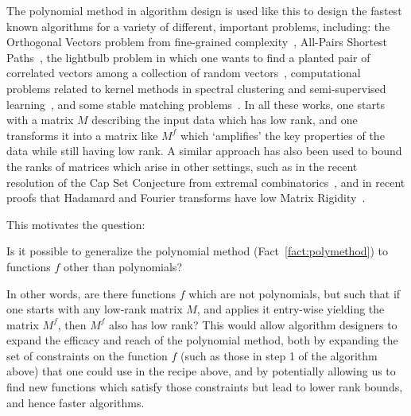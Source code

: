 The polynomial method in algorithm design is used like this to design the fastest known algorithms for a variety of different, important problems, including: the Orthogonal Vectors problem from fine-grained complexity~\cite{awy14,cw16}, All-Pairs Shortest Paths~\cite{w18,cw16}, the lightbulb problem in which one wants to find a planted pair of correlated vectors among a collection of random vectors~\cite{v12,kkk18,a18}, computational problems related to kernel methods in spectral clustering and semi-supervised learning~\cite{acss20}, and some stable matching problems~\cite{mps16}. In all these works, one starts with a matrix $M$ describing the input data which has low rank, and one transforms it into a matrix like $M^f$ which `amplifies' the key properties of the data while still having low rank. A similar approach has also been used to bound the ranks of matrices which arise in other settings, such as in the recent resolution of the Cap Set Conjecture from extremal combinatorics~\cite{clp17, eg17}, and in recent proofs that Hadamard and Fourier transforms have low Matrix Rigidity~\cite{aw17, dvir2017matrix, dvir2019fourier}.

This motivates the question: 
\begin{question}\label{question:polys}
Is it possible to generalize the polynomial method (Fact~\ref{fact:polymethod}) to functions $f$ other than polynomials?
\end{question}
In other words, are there functions $f$ which are not polynomials, but such that if one starts with any low-rank matrix $M$, and applies it entry-wise yielding the matrix $M^f$, then $M^f$ also has low rank? This would allow algorithm designers to expand the efficacy and reach of the polynomial method, both by expanding the set of constraints on the function $f$ (such as those in step 1 of the algorithm above) that one could use in the recipe above, and by potentially allowing us to find new functions which satisfy those constraints but lead to lower rank bounds, and hence faster algorithms.

